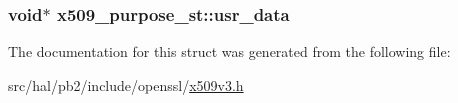 \subsubsection[{\texorpdfstring{usr\+\_\+data}{usr_data}}]{\setlength{\rightskip}{0pt plus 5cm}void$\ast$ x509\+\_\+purpose\+\_\+st\+::usr\+\_\+data}\hypertarget{structx509__purpose__st_a50555ed3f80ed1a0bfed457c7649c600}{}\label{structx509__purpose__st_a50555ed3f80ed1a0bfed457c7649c600}


The documentation for this struct was generated from the following file\+:\begin{DoxyCompactItemize}
\item 
src/hal/pb2/include/openssl/\hyperlink{x509v3_8h}{x509v3.\+h}\end{DoxyCompactItemize}
